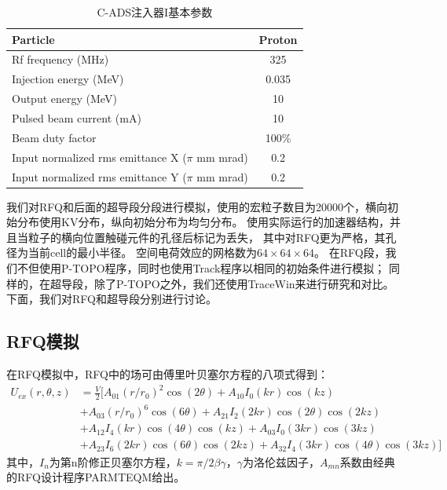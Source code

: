 \begin{table}[!htbp]
    \centering
    \footnotesize%
    \setlength{\tabcolsep}{4pt}%
    \renewcommand{\arraystretch}{1.2}%
    \begin{tabular}{lc}
        \hline\hline
        Particle                & Proton \\
        \hline
        Rf frequency (MHz)      & 325       \\
        \hline
        Injection energy (MeV)  & 0.035     \\
        \hline
        Output energy (MeV)     & 10        \\
        \hline
        Pulsed beam current (mA)& 10        \\
        \hline
        Beam duty factor        & 100\%     \\
        \hline
        Input normalized rms emittance X ($\pi$ mm mrad)    & 0.2        \\
        \hline
        Input normalized rms emittance Y ($\pi$ mm mrad)    & 0.2        \\
        \hline\hline
    \end{tabular}
    \caption{C-ADS注入器I基本参数}
    \label{tab:C_ADS_parameters}
\end{table}

我们对RFQ和后面的超导段分段进行模拟，使用的宏粒子数目为20000个，横向初始分布使用KV分布，纵向初始分布为均匀分布。
使用实际运行的加速器结构，并且当粒子的横向位置触碰元件的孔径后标记为丢失，
其中对RFQ更为严格，其孔径为当前cell的最小半径。
空间电荷效应的网格数为$64 \times 64 \times 64$。
在RFQ段，我们不但使用P-TOPO程序，同时也使用Track程序\cite{aseev2005track}以相同的初始条件进行模拟；
同样的，在超导段，除了P-TOPO之外，我们还使用TraceWin\cite{uriot2014tracewin}来进行研究和对比。
下面，我们对RFQ和超导段分别进行讨论。

\subsection{RFQ模拟}
在RFQ模拟中，RFQ中的场可由傅里叶贝塞尔方程的八项式得到：
\begin{equation}
    \begin{aligned}
       {{U}_{ex}}(r,\theta ,z) & =\frac{V}{2}[{{A}_{01}}{{(r/{{r}_{0}})}^{2}}\cos (2\theta )+{{A}_{10}}{{I}_{0}}(kr)\cos (kz) \\
     & +{{A}_{03}}{{(r/{{r}_{0}})}^{6}}\cos (6\theta )+{{A}_{21}}{{I}_{2}}(2kr)\cos (2\theta )\cos (2kz) \\
     & +{{A}_{12}}{{I}_{4}}(kr)\cos (4\theta )\cos (kz)+{{A}_{03}}{{I}_{0}}(3kr)\cos (3kz) \\
     & +{{A}_{23}}{{I}_{6}}(2kr)\cos (6\theta )\cos (2kz)+{{A}_{32}}{{I}_{4}}(3kr)\cos (4\theta )\cos (3kz)]
    \end{aligned}
    \label{eq:RFQ_8terms}
\end{equation}
其中，$I_n$为第n阶修正贝塞尔方程，$k=\pi /2\beta \gamma$，$\gamma$为洛伦兹因子，$A_{mn}$系数由经典的RFQ设计程序PARMTEQM\cite{PARMTEQ_6925500}给出。

